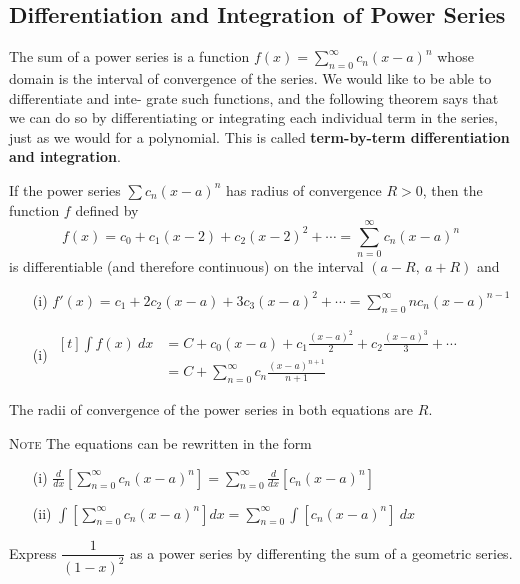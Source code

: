   \subsection*{Differentiation and Integration of Power Series}
    The sum of a power series is a function $f(x) = \sum_{n=0}^{\infty} c_n (x-a)^n$ whose domain is the interval of convergence of the series. We would like to be able to differentiate and inte- grate such functions, and the following theorem says that we can do so by differentiating or integrating each individual term in the series, just as we would for a polynomial. This is called \textbf{term-by-term differentiation and integration}.
    \begin{theorem}
      If the power series $\sum c_n (x-a)^n$ has radius of convergence $R>0$, then the function $f$ defined by
      $$ f(x) = c_0 + c_1(x-2) + c_2(x-2)^2 + \cdots = \sum_{n=0}^{\infty} c_n(x-a)^n $$
      is differentiable (and therefore continuous) on the interval $(a-R,\ a+R)$ and
      \begin{enumerate}
        \item[(i)] $f'(x) = c_1 + 2c_2 (x-a) + 3c_3 (x-a)^2 + \cdots = \sum_{n=0}^{\infty} nc_n (x-a)^{n-1}$
        \item[(i)]
        $\begin{aligned}[t]
          \int f(x)\ dx &= C + c_0 (x-a) + c_1 \frac{(x-a)^2}{2} + c_2 \frac{(x-a)^3}{3} + \cdots \\
                        &= C + \sum_{n=0}^{\infty} c_n \frac{(x-a)^{n+1}}{n+1}
        \end{aligned}$
      \end{enumerate}
      The radii of convergence of the power series in both equations are $R$.
    \end{theorem}
    \begin{minipage}{\textwidth}
    \textsc{Note} The equations can be rewritten in the form
      \begin{enumerate}
        \item[(i)] $\displaystyle \frac{d}{dx} \left[ \sum_{n=0}^{\infty} c_n(x-a)^n \right] = \sum_{n=0}^{\infty} \frac{d}{dx} [c_n(x-a)^n]$
        \item[(ii)] $\displaystyle \int \left[ \sum_{n=0}^{\infty} c_n(x-a)^n \right]dx = \sum_{n=0}^{\infty} \int [c_n(x-a)^n]\ dx$
      \end{enumerate}
    \end{minipage}
    \begin{example}
      Express $\dfrac{1}{(1-x)^2}$ as a power series by differenting the sum of a geometric series.
    \end{example}
